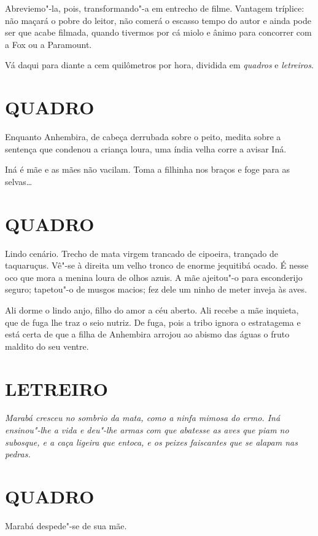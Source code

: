 Abreviemo"-la, pois, transformando"-a em entrecho de filme. Vantagem
tríplice: não maçará o pobre do leitor, não comerá o escasso tempo do
autor e ainda pode ser que acabe filmada, quando tivermos por cá miolo e
ânimo para concorrer com a Fox ou a Paramount.

Vá daqui para diante a cem quilômetros por hora, dividida em
\emph{quadros} e \emph{letreiros}.

\section*{QUADRO}

Enquanto Anhembira, de cabeça derrubada sobre o peito, medita sobre a
sentença que condenou a criança loura, uma índia velha corre a avisar
Iná.

Iná é mãe e as mães não vacilam. Toma a filhinha nos braços e foge para
as selvas\ldots{}

\section*{QUADRO}

Lindo cenário. Trecho de mata virgem trancado de cipoeira, trançado de
taquaruçus. Vê"-se à direita um velho tronco de enorme jequitibá ocado. É
nesse oco que mora a menina loura de olhos azuis. A mãe ajeitou"-o para
esconderijo seguro; tapetou"-o de musgos macios; fez dele um ninho de
meter inveja às aves.

Ali dorme o lindo anjo, filho do amor a céu aberto. Ali recebe a mãe
inquieta, que de fuga lhe traz o seio nutriz. De fuga, pois a tribo
ignora o estratagema e está certa de que a filha de Anhembira arrojou ao
abismo das águas o fruto maldito do seu ventre.

\section*{LETREIRO}

\emph{Marabá cresceu no sombrio da mata, como a ninfa mimosa do ermo.
Iná ensinou"-lhe a vida e deu"-lhe armas com que abatesse as aves que piam
no subosque, e a caça ligeira que entoca, e os peixes faiscantes que se
alapam nas pedras.}

\section*{QUADRO}

Marabá despede"-se de sua mãe.

